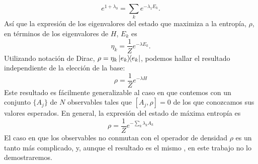 \begin{equation*}
    e^{1+\lambda_{0}}=\sum_{k}e^{-\lambda_{1}E_{k}}.
\end{equation*}
Así que la expresión de los eigenvalores del estado que maximiza a la entropía, $\rho$, en términos de los eigenvalores de $H$, $E_{k}$ es
\begin{equation*}
    \eta_{k}=\frac{1}{Z}e^{-\lambda E_{k}}.
\end{equation*}
Utilizando notación de Dirac, $\rho=\eta_{k}\dyad{e_{k}}$, podemos hallar el resultado independiente de la elección de la base:
\begin{equation}
    \rho=\frac{1}{Z}e^{-\lambda H}
\end{equation}
Este resultado es fácilmente generalizable al caso en que contemos con un  conjunto $\{A_{j}\}$ de $N$ observables tales que $[A_{j},\rho]=0$ de los que conozcamos sus valores esperados. En general, la expresión del estado de máxima entropía es
\begin{equation}
    \rho=\frac{1}{Z}e^{-\sum_{k}\lambda_{k} A_{k}}
\end{equation}
El caso en que los observables no conmutan con el operador de densidad $\rho$ es un tanto más complicado, y, aunque el resultado es el mismo \cite{FormalJaynes}, en este trabajo no lo demostraremos.


